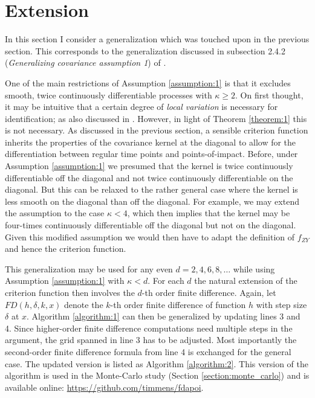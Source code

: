 \section{Extension}
\label{section:extension}

In this section I consider a generalization which was touched upon in the previous
section. This corresponds to the generalization discussed in subsection 2.4.2
(\emph{Generalizing covariance assumption 1}) of \cite{Kneip2020}.

One of the main restrictions of Assumption \ref{assumption:1} is that it excludes
smooth, twice continuously differentiable processes with $\kappa \geq 2$. On first
thought, it may be intuitive that a certain degree of \emph{local variation} is
necessary for identification; as also discussed in \cite{Kneip2016}. However, in light
of Theorem \ref{theorem:1} this is not necessary. As discussed in the previous section,
a sensible criterion function inherits the properties of the covariance kernel at the
diagonal to allow for the differentiation between regular time points and
points-of-impact. Before, under Assumption \ref{assumption:1} we presumed that the
kernel is twice continuously differentiable off the diagonal and not twice continuously
differentiable on the diagonal. But this can be relaxed to the rather general case where
the kernel is less smooth on the diagonal than off the diagonal. For example, we may
extend the assumption to the case $\kappa < 4$, which then implies that the kernel may
be four-times continuously differentiable off the diagonal but not on the diagonal.
Given this modified assumption we would then have to adapt the definition of $f_{ZY}$
and hence the criterion function.

This generalization may be used for any even $d = 2, 4, 6, 8, \dots$ while using
Assumption \ref{assumption:1} with $\kappa < d$. For each $d$ the natural extension of
the criterion function then involves the $d$-th order finite difference. Again, let
$FD(h, \delta, k, x)$ denote the $k$-th order finite difference of function $h$ with
step size $\delta$ at $x$. Algorithm \ref{algorithm:1} can then be generalized by
updating lines 3 and 4. Since higher-order finite difference computations need multiple
steps in the argument, the grid spanned in line 3 has to be adjusted. Most importantly
the second-order finite difference formula from line 4 is exchanged for the general
case. The updated version is listed as Algorithm \ref{algorithm:2}. This version of the
algorithm is used in the Monte-Carlo study (Section \ref{section:monte_carlo}) and is
available online: \url{https://github.com/timmens/fdapoi}.

